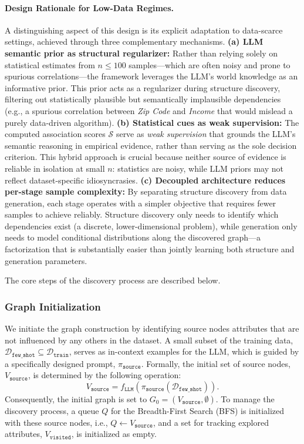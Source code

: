 \paragraph{Design Rationale for Low-Data Regimes.}
A distinguishing aspect of this design is its explicit adaptation to data-scarce settings, achieved through three complementary mechanisms. \textbf{(a) LLM semantic prior as structural regularizer:} Rather than relying solely on statistical estimates from $n \le 100$ samples---which are often noisy and prone to spurious correlations---the framework leverages the LLM's world knowledge as an informative prior. This prior acts as a regularizer during structure discovery, filtering out statistically plausible but semantically implausible dependencies (e.g., a spurious correlation between \textit{Zip Code} and \textit{Income} that would mislead a purely data-driven algorithm). \textbf{(b) Statistical cues as weak supervision:} The computed association scores $\mathcal{S}$ serve as \emph{weak supervision} that grounds the LLM's semantic reasoning in empirical evidence, rather than serving as the sole decision criterion. This hybrid approach is crucial because neither source of evidence is reliable in isolation at small $n$: statistics are noisy, while LLM priors may not reflect dataset-specific idiosyncrasies. \textbf{(c) Decoupled architecture reduces per-stage sample complexity:} By separating structure discovery from data generation, each stage operates with a simpler objective that requires fewer samples to achieve reliably. Structure discovery only needs to identify which dependencies exist (a discrete, lower-dimensional problem), while generation only needs to model conditional distributions along the discovered graph---a factorization that is substantially easier than jointly learning both structure and generation parameters.

The core steps of the discovery process are described below.

\subsubsection{Graph Initialization}
We initiate the graph construction by identifying source nodes attributes that are not influenced by any others in the dataset. A small subset of the training data, $\mathcal{D}_{\mathtt{few\_shot}} \subseteq \mathcal{D}_{\mathtt{train}}$, serves as in-context examples for the LLM, which is guided by a specifically designed prompt, $\pi_{\mathtt{source}}$. Formally, the initial set of source nodes, $V_{\mathtt{source}}$, is determined by the following operation:
\begin{equation}
    V_{\mathtt{source}} = f_{\mathtt{LLM}}(\pi_{\mathtt{source}} ( \mathcal{D}_{\mathtt{few\_shot}})) .
\end{equation}
Consequently, the initial graph is set to $G_0 = (V_{\mathtt{source}}, \emptyset)$. To manage the discovery process, a queue $Q$ for the Breadth-First Search (BFS) is initialized with these source nodes, i.e., $Q \leftarrow V_{\mathtt{source}}$, and a set for tracking explored attributes, $V_{\mathtt{visited}}$, is initialized as empty.

